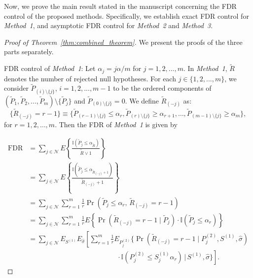 \documentclass[11pt]{article}
\numberwithin{equation}{section}
\theoremstyle{plain}
\theoremstyle{remark}
\begin{document}
Now, we prove the main result stated in the manuscript concerning the FDR control of the proposed methods. Specifically, we establish exact FDR control for \textit{Method~1}, and asymptotic FDR control for \textit{Method~2} and \textit{Method~3}.

\begin{proof}[Proof of Theorem~\ref{thm:combined_theorem}] We present the proofs of the three parts separately.

FDR control of \textit{Method~1}: 
Let $\alpha_j=j\alpha/m$ for $j=1,2,...,m$. In \textit{Method~1}, $\tilde{R}$ denotes the number of rejected null hypotheses. For each $j\in \{1,2,...,m\}$, we consider $\tilde{P}_{(i)\setminus\{j\}}$, $i=1,2,...,m-1$ to be the ordered components of $(\tilde{P}_1, \tilde{P}_2, ..., \tilde{P}_m)\setminus\{\tilde{P}_j\}$ and $\tilde{P}_{(0)\setminus\{j\}}=0$. We define $\tilde{R}_{(-j)}$ as:
\[
\{\tilde{R}_{(-j)} = r - 1\} \equiv \{\tilde{P}_{(r-1)\setminus \{j\}} \leq \alpha_r, \tilde{P}_{(r)\setminus \{j\}} \geq \alpha_{r+1}, \ldots, \tilde{P}_{(m-1)\setminus \{j\}} \geq \alpha_m\},
\]
for $r = 1,2, \ldots, m$. Then the FDR of \textit{Method~1} is given by

\begin{align*}
\mathrm{FDR} &= \sum_{j \in \mathcal{N}} E \left\{ \frac{\mathbb{I}\left(\tilde{P}_j \leq \alpha_{\tilde{R}}\right)}{\tilde{R} \vee 1} \right\} \\
&= \sum_{j \in \mathcal{N}} E \left\{ \frac{\mathbb{I}\left(\tilde{P}_j \leq \alpha_{\tilde{R}_{(-j)}+1}\right)}{\tilde{R}_{(-j)} + 1} \right\} \\
&= \sum_{j \in \mathcal{N}} \sum_{r=1}^{m} \frac{1}{r} \Pr\left(\tilde{P}_j \leq \alpha_r,\, \tilde{R}_{(-j)} = r - 1\right) \\
&= \sum_{j \in \mathcal{N}} \sum_{r=1}^{m} \frac{1}{r} E \left\{ \Pr(\tilde{R}_{(-j)} = r - 1 \mid \tilde{P}_j) 
\cdot \mathbb{I}(\tilde{P}_j \leq \alpha_r) \right\} \\
&= \sum_{j \in \mathcal{N}} E_{S^{(1)}} E_{\hat{\sigma}} \left[ \sum_{r=1}^{m} \frac{1}{r} E_{P_j^{(2)}} \Big\{ 
\Pr\left(\tilde{R}_{(-j)} = r - 1 \mid P^{(2)}_j, S^{(1)}, \hat{\sigma}\right) \right. \\
&\qquad\qquad\qquad\qquad\qquad\qquad\quad \left. \cdot\, \mathbb{I}(P^{(2)}_j \leq S^{(1)}_j\alpha_r) \,\Big|\, S^{(1)}, \hat{\sigma} \Big\} \right].
\end{align*}



\end{proof}
\end{document}
